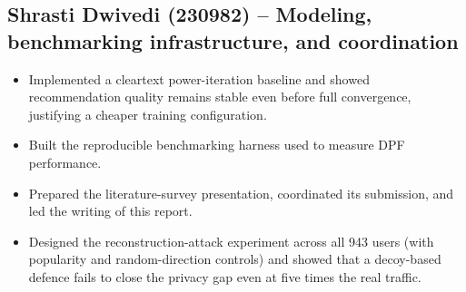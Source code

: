 \documentclass[11pt]{article}
\begin{document}
\subsection*{Shrasti Dwivedi (230982) -- Modeling, benchmarking infrastructure, and coordination}
\begin{itemize}
    \item Implemented a cleartext power-iteration baseline and showed recommendation quality remains stable even before full convergence, justifying a cheaper training configuration.
    \item Built the reproducible benchmarking harness used to measure DPF performance.
    \item Prepared the literature-survey presentation, coordinated its submission, and led the writing of this report.
    \item Designed the reconstruction-attack experiment across all 943 users (with popularity and random-direction controls) and showed that a decoy-based defence fails to close the privacy gap even at five times the real traffic.
\end{itemize}
\end{document}
